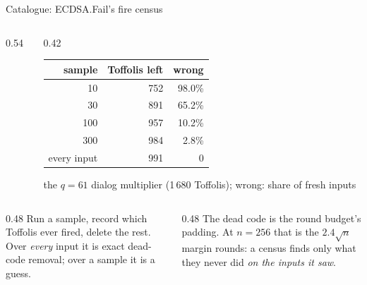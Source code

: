 \documentclass[aspectratio=169,11pt]{beamer}
\newcommand{\code}[2][]{}
\begin{document}
\begin{frame}[fragile]{Catalogue: ECDSA.Fail's fire census}
  \begin{columns}[T]
    \begin{column}{0.54\textwidth}
      \code[basicstyle=\ttfamily\scriptsize]{census.py}
    \end{column}
    \begin{column}{0.42\textwidth}
      \centering\footnotesize
      \renewcommand{\arraystretch}{1.1}
      \begin{tabular}{@{}rrr@{}}
        \toprule
        sample & Toffolis left & wrong \\
        \midrule
        10 & 752 & 98.0\% \\
        30 & 891 & 65.2\% \\
        100 & 957 & 10.2\% \\
        300 & 984 & 2.8\% \\
        every input & 991 & 0 \\
        \bottomrule
      \end{tabular}\par
      {\scriptsize the $q=61$ dialog multiplier (1\,680 Toffolis); wrong: share of fresh inputs}
    \end{column}
  \end{columns}
  \vskip3mm
  \begin{columns}[T]
    \begin{column}{0.48\textwidth}
      \small Run a sample, record which Toffolis ever fired, delete the rest. Over \emph{every} input it is exact dead-code removal; over a sample it is a guess.
    \end{column}
    \begin{column}{0.48\textwidth}
      \small The dead code is the round budget's padding. At $n=256$ that is the $2.4\sqrt n$ margin rounds: a census finds only what they never did \emph{on the inputs it saw}.
    \end{column}
  \end{columns}
\end{frame}
\end{document}

